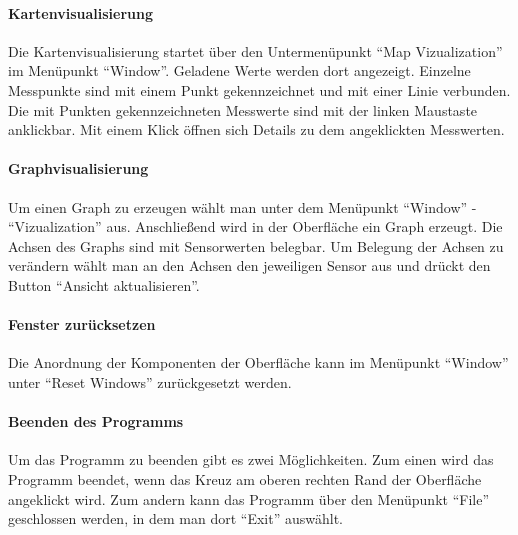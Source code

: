 \paragraph{Kartenvisualisierung}
Die Kartenvisualisierung startet über den Untermenüpunkt ``Map Vizualization'' im Menüpunkt ``Window''. Geladene Werte werden dort angezeigt. Einzelne Messpunkte sind mit einem Punkt gekennzeichnet und mit einer Linie verbunden. Die mit Punkten gekennzeichneten Messwerte sind mit der linken Maustaste anklickbar. Mit einem Klick öffnen sich Details zu dem angeklickten Messwerten.

\paragraph{Graphvisualisierung}
Um einen Graph zu erzeugen wählt man unter dem Menüpunkt ``Window'' - ``Vizualization'' aus. Anschließend wird in der Oberfläche ein Graph erzeugt. Die Achsen des Graphs sind mit Sensorwerten belegbar. Um Belegung der Achsen zu verändern wählt man an den Achsen den jeweiligen Sensor aus und drückt den Button ``Ansicht aktualisieren''.


\paragraph{Fenster zurücksetzen}
Die Anordnung der Komponenten der Oberfläche kann im Menüpunkt ``Window'' unter ``Reset Windows'' zurückgesetzt werden.

\paragraph{Beenden des Programms}
Um das Programm zu beenden gibt es zwei Möglichkeiten. Zum einen wird das Programm beendet, wenn das Kreuz am oberen rechten Rand der Oberfläche angeklickt wird. Zum andern kann das Programm über den Menüpunkt ``File'' geschlossen werden, in dem man dort ``Exit'' auswählt.